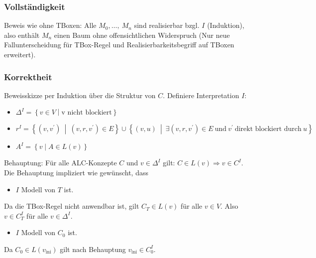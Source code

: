 \subsubsection{Vollständigkeit}\label{vollstuxe4ndigkeit}

Beweis wie ohne TBoxen: Alle $M_{0},\ldots,\ M_{n}$ sind realisierbar
bzgl. $I$ (Induktion), also enthält $M_{n}$ einen Baum ohne
offensichtlichen Widerspruch (Nur neue Fallunterscheidung für TBox-Regel
und Realisierbarkeitsbegriff auf TBoxen erweitert).

\subsubsection{Korrektheit}\label{korrektheit}

Beweisskizze per Induktion über die Struktur von $C$. Definiere
Interpretation $I$:

\begin{itemize}
\item
  $\Delta^{I} = \left\{ v \in V \middle| \text{v\ }\mathrm{\text{nicht\ blockiert}} \right\}$
\item
  $r^{I} = \left\{ \left( v,v^{'} \right)\  \middle| \ \left( v,r,v^{'} \right) \in E \right\} \cup \left\{ \left( v,u \right)\  \middle| \ \exists\left( v,r,v^{'} \right) \in E\mathrm{\ }\mathrm{\text{und}}\mathrm{\ }v^{'}\mathrm{\ }\mathrm{\text{direkt\ blockiert\ durch}}\mathrm{\ }u \right\}$
\item
  $A^{I} = \left\{ v \middle| A \in L\left( v \right) \right\}$
\end{itemize}

Behauptung: Für alle ALC-Konzepte $C$ und $v \in \Delta^{I}$ gilt:
$C \in L\left( v \right) \Rightarrow v \in C^{I}$. Die Behauptung
impliziert wie gewünscht, dass

\begin{itemize}
\item
  $I$ Modell von $T$ ist.
\end{itemize}

Da die TBox-Regel nicht anwendbar ist, gilt
$C_{T} \in L\left( v \right)$ für alle $v \in V$. Also
$v \in C_{T}^{I}$ für alle $v \in \Delta^{I}$.

\begin{itemize}
\item
  $I$ Modell von $C_{0}$ ist.
\end{itemize}

Da $C_{0} \in L\left( v_{\text{ini}} \right)$ gilt nach Behauptung
$v_{\text{ini}} \in C_{0}^{I}$.

